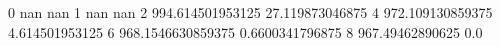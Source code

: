 0 nan nan
1 nan nan
2 994.614501953125 27.119873046875
4 972.109130859375 4.614501953125
6 968.1546630859375 0.6600341796875
8 967.49462890625 0.0
